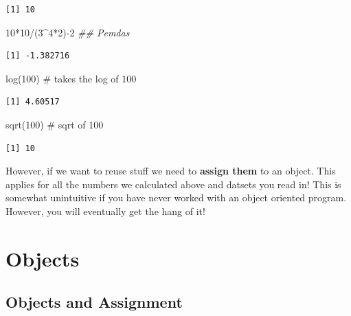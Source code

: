 \documentclass[
  letterpaper,
  DIV=11,
  numbers=noendperiod,
  oneside]{scrreprt}
\newenvironment{Shaded}{\begin{snugshade}}{\end{snugshade}}
\newcommand{\CommentTok}[1]{\textcolor[rgb]{0.37,0.37,0.37}{#1}}
\newcommand{\DecValTok}[1]{\textcolor[rgb]{0.68,0.00,0.00}{#1}}
\newcommand{\DocumentationTok}[1]{\textcolor[rgb]{0.37,0.37,0.37}{\textit{#1}}}
\newcommand{\FunctionTok}[1]{\textcolor[rgb]{0.28,0.35,0.67}{#1}}
\newcommand{\NormalTok}[1]{\textcolor[rgb]{0.00,0.23,0.31}{#1}}
\newcommand{\SpecialCharTok}[1]{\textcolor[rgb]{0.37,0.37,0.37}{#1}}
\begin{document}
\begin{verbatim}
[1] 10
\end{verbatim}

\begin{Shaded}
\begin{Highlighting}[]
\DecValTok{10}\SpecialCharTok{*}\DecValTok{10}\SpecialCharTok{/}\NormalTok{(}\DecValTok{3}\SpecialCharTok{\^{}}\DecValTok{4}\SpecialCharTok{*}\DecValTok{2}\NormalTok{)}\SpecialCharTok{{-}}\DecValTok{2} \DocumentationTok{\#\# Pemdas }
\end{Highlighting}
\end{Shaded}

\begin{verbatim}
[1] -1.382716
\end{verbatim}

\begin{Shaded}
\begin{Highlighting}[]
\FunctionTok{log}\NormalTok{(}\DecValTok{100}\NormalTok{) }\CommentTok{\# takes the log of 100}
\end{Highlighting}
\end{Shaded}

\begin{verbatim}
[1] 4.60517
\end{verbatim}

\begin{Shaded}
\begin{Highlighting}[]
\FunctionTok{sqrt}\NormalTok{(}\DecValTok{100}\NormalTok{) }\CommentTok{\# sqrt of 100}
\end{Highlighting}
\end{Shaded}

\begin{verbatim}
[1] 10
\end{verbatim}

However, if we want to reuse stuff we need to \textbf{assign them} to an
object. This applies for all the numbers we calculated above and datsets
you read in! This is somewhat unintuitive if you have never worked with
an object oriented program. However, you will eventually get the hang of
it!

\hypertarget{objects}{%
\section{Objects}\label{objects}}

\hypertarget{objects-and-assignment}{%
\subsection{Objects and Assignment}\label{objects-and-assignment}}
\end{document}
